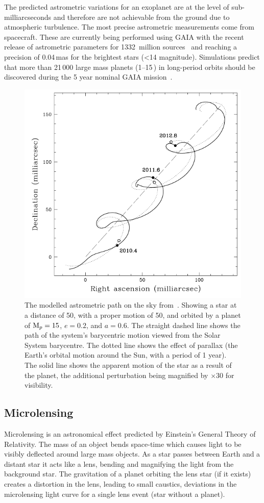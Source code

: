 The predicted astrometric variations for an exoplanet are at the level of sub-milliarcseconds and therefore are not achievable from the ground due to atmospheric turbulence.
The most precise astrometric measurements come from spacecraft.
These are currently being performed using GAIA with the recent release of astrometric parameters for 1332~million sources~\citep{gaiacollaboration_gaia_2018} and reaching a precision of 0.04\,mas for the brightest stars (<14 magnitude).
Simulations predict that more than 21\,000 large mass planets (1--15\,\Mjup) in long-period orbits should be discovered during the 5 year nominal GAIA mission~\citep{perryman_astrometric_2014}.

\begin{figure}
    \centering
    \includegraphics[width=0.5\linewidth]{./figures/introduction/Astrometry_Perryman2000.png}
    \caption[Modelled astrometric path on the sky.]{The modelled astrometric path on the sky from~\citet{perryman_extrasolar_2000}.
    Showing a star at a distance of 50\pc, with a proper motion of 50\masperyr{}, and orbited by a planet of \(\textrm{M}_{p}=15\)\Mjup{}, \(e=0.2\), and \(a=0.6\)\AU{}.
    The straight dashed line shows the path of the system's barycentric motion viewed from the Solar System barycentre.
    The dotted line shows the effect of parallax (the Earth's orbital motion around the Sun, with a period of 1 year).
    The solid line shows the apparent motion of the star as a result of the planet, the additional perturbation being magnified by $\times 30$ for visibility.}
    \label{fig:astrometry_perryman}
\end{figure}


\subsection{Microlensing}
\label{subsec:microlensing}
Microlensing is an astronomical effect predicted by Einstein's General Theory of Relativity.
The mass of an object bends space-time which causes light to be visibly deflected around large mass objects.
As a star passes between Earth and a distant star it acts like a lens, bending and magnifying the light from the background star.
The gravitation of a planet orbiting the lens star (if it exists) creates a distortion in the lens, leading to small caustics, deviations in the microlensing light curve for a single lens event (star without a planet).

